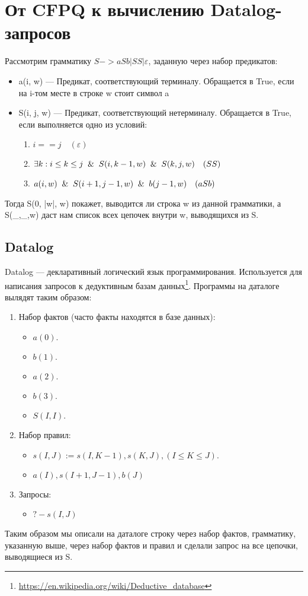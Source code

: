 \section{От CFPQ к вычислению Datalog-запросов}\label{Subsection Datalog}
Рассмотрим грамматику  $S -> aSb | SS | \varepsilon$, заданную через набор предикатов:
\begin{itemize}
	\item a(i, w) --- Предикат, соответствующий терминалу. Обращается в True, если на i-том месте в строке w стоит символ a
	\item S(i, j, w) --- Предикат, соответствующий нетерминалу. Обращается в True, если выполняется одно из условий:
	\begin{enumerate}
		\item $i == j \quad(\varepsilon)$
		\item $\exists k: i \leq k \leq j \And S(i, k - 1, w) \And S(k, j, w)  \quad (SS)$
		\item  ${a(i, w) \And S(i+1, j-1, w) \And b(j-1, w)} \quad (aSb)$
	\end{enumerate}
\end{itemize}

Тогда S(0, |w|, w) покажет, выводится ли строка w из данной грамматики,
а S(\_,\_,w) даст нам список всех цепочек внутри w, выводящихся из S.

\subsection{Datalog}
Datalog --- декларативный логический язык программирования. Используется для написания запросов к дедуктивным базам данных\footnote{\url{https://en.wikipedia.org/wiki/Deductive_database}}. Программы на даталоге вылядят таким образом:
\begin{enumerate}
	\item Набор фактов (часто факты находятся в базе данных):
	\begin{itemize}
		\item $a(0).$
		\item $b(1).$
		\item $a(2).$
		\item $b(3).$
		\item $S(I, I).$
	\end{itemize}
	\item Набор правил:
	\begin{itemize}
		\item $s(I, J) := s(I, K-1), s(K,J), (I \leq K \leq J).$
		\item $a(I), s(I+1, J-1),b(J)$
	\end{itemize}
	\item Запросы:
	\begin{itemize}
		\item $?- s(I, J)$
	\end{itemize}
\end{enumerate}
Таким образом мы описали на даталоге строку через набор фактов, грамматику, указанную выше, через набор фактов и правил и сделали запрос на все цепочки, выводящиеся из S. 


